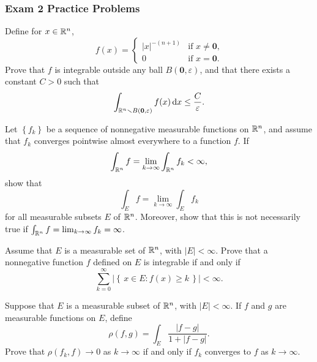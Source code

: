 \subsubsection{Exam 2 Practice Problems}
\setcounter{exercise}{0}
\setcounter{equation}{0}

\begin{problem}
  Define for \( x \in\mathbb{R}^n\),
  \[
    f(x)=
    \begin{cases}
      \left| x \right|^{-(n+1)}&\text{if \(x\neq\mathbf{0}\),}\\
      0&\text{if \(x=\mathbf{0}\).}
    \end{cases}
  \]
  Prove that \(f\) is integrable outside any ball
  \(B(\mathbf{0},\varepsilon)\), and that there exists a constant \(C>0\)
  such that
  \[
    \int_{\mathbb{R}^n\smallsetminus B(\mathbf{0},\varepsilon)}f( x ) \mathop{}\!\mathrm{d} x
    \leq\frac{C}{\varepsilon}.
  \]
\end{problem}
\begin{solution}
\end{solution}

\begin{problem}
  Let \(\left\{f_k\right\}\) be a sequence of nonnegative measurable
  functions on \(\mathbb{R}^n\), and assume that \(f_k\) converges pointwise
  almost everywhere to a function \(f\). If
\[
\int_{\mathbb{R}^n} f=\lim_{k\to\infty}\int_{\mathbb{R}^n} f_k<\infty,
\]
show that
\[
\int_E f=\lim_{k\to\infty}\int_E f_k
\]
for all measurable subsets \(E\) of \(\mathbb{R}^n\). Moreover, show that this is
not necessarily true if \(\int_{\mathbb{R}^n} f=\lim_{k\to\infty} f_k=\infty\).
\end{problem}
\begin{solution}
\end{solution}

\begin{problem}
  Assume that \(E\) is a measurable set of \(\mathbb{R}^n\), with
  \(|E|<\infty\). Prove that a nonnegative function \(f\) defined on \(E\)
  is integrable if and only if
\[
\sum_{k=0}^\infty\left|\left\{\, x \in E:f( x )\geq
    k\,\right\}\right|<\infty.
\]
\end{problem}
\begin{solution}
\end{solution}
\begin{problem}
  Suppose that \(E\) is a measurable subset of \(\mathbb{R}^n\), with
  \(|E|<\infty\). If \(f\) and \(g\) are measurable functions on \(E\),
  define
\[
\rho(f,g)=\int_E\frac{|f-g|}{1+|f-g|}.
\]
Prove that \(\rho(f_k,f)\to 0\) as \(k\to\infty\) if and only if \(f_k\)
converges to \(f\) as \(k\to\infty\).
\end{problem}
\begin{solution}
\end{solution}

